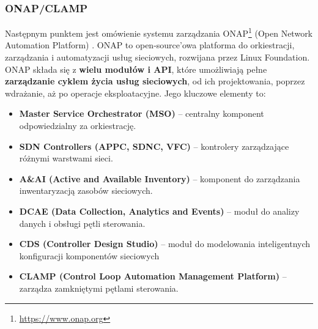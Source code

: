\subsubsection{ONAP/CLAMP}

Następnym punktem \cite{fallon2019} jest omówienie systemu zarządzania ONAP\footnote{\url{https://www.onap.org}} (Open Network Automation Platform) \cite{onap2018}. ONAP to open-source’owa platforma do orkiestracji, zarządzania i automatyzacji usług sieciowych, rozwijana przez Linux Foundation. ONAP składa się z \textbf{wielu modułów i API}, które umożliwiają pełne \textbf{zarządzanie cyklem życia usług sieciowych}, od ich projektowania, poprzez wdrażanie, aż po operacje eksploatacyjne. Jego kluczowe elementy to:
\begin{itemize}
    \item \textbf{Master Service Orchestrator (MSO)} – centralny komponent odpowiedzialny za orkiestrację.
    \item \textbf{SDN Controllers (APPC, SDNC, VFC)} – kontrolery zarządzające różnymi warstwami sieci.
    \item \textbf{A\&AI (Active and Available Inventory)} – komponent do zarządzania inwentaryzacją zasobów sieciowych.
    \item \textbf{DCAE (Data Collection, Analytics and Events)} – moduł do analizy danych i obsługi pętli sterowania.
    \item \textbf{CDS (Controller Design Studio)} – moduł do modelowania inteligentnych konfiguracji komponentów sieciowych
    \item \textbf{CLAMP (Control Loop Automation Management Platform)} – zarządza zamkniętymi pętlami sterowania.
\end{itemize}

